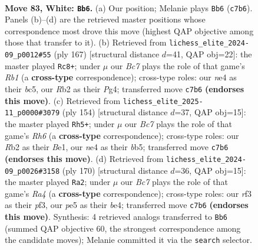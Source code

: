 \documentclass[11pt]{article}
\begin{document}
\clearpage

\begin{figure}[p]\centering
\begin{subfigure}{0.46\textwidth}\centering
\resizebox{\linewidth}{!}{%
\newchessgame
\chessboard[
  setfen={8/2B5/4k2p/3pp1b1/1K2n2p/5r2/1R6/8 w - - 0 83},
  showmover=false,
  pgfstyle=straightmove, color=movearrow, markmove={c7-b6}
]}
\caption{}
\end{subfigure}\hfill
\begin{subfigure}{0.46\textwidth}\centering
\resizebox{\linewidth}{!}{%
\newchessgame
\chessboard[
  setfen={1r6/8/1PKP2k1/2B5/6p1/8/8/5R2 b - - 3 84},
  showmover=false,
  pgfstyle=straightmove, color=movearrow, markmove={b8-c8}
]}
\caption{}
\end{subfigure}
\\[4pt]
\begin{subfigure}{0.46\textwidth}\centering
\resizebox{\linewidth}{!}{%
\newchessgame
\chessboard[
  setfen={8/8/p2n3R/Pbpk4/5K2/8/8/4B3 w - - 33 78},
  showmover=false,
  pgfstyle=straightmove, color=movearrow, markmove={h6-h5}
]}
\caption{}
\end{subfigure}\hfill
\begin{subfigure}{0.46\textwidth}\centering
\resizebox{\linewidth}{!}{%
\newchessgame
\chessboard[
  setfen={8/8/6p1/7p/R3b2P/3nkp2/8/5K2 w - - 4 86},
  showmover=false,
  pgfstyle=straightmove, color=movearrow, markmove={a4-a2}
]}
\caption{}
\end{subfigure}
\caption{\textbf{Move 83, White: \texttt{Bb6}.} (a) Our position; Melanie plays \texttt{Bb6} (\texttt{c7b6}). Panels (b)--(d) are the retrieved master positions whose correspondence most drove this move (highest QAP objective among those that transfer to it). (b) Retrieved from \texttt{lichess\_elite\_2024-09\_p0012\#55} (ply 167) [structural distance $d$=41, QAP obj=22]: the master played \texttt{Rc8+}; under $\mu$ our \emph{Bc7} plays the role of that game's \emph{Rb1} (a \textbf{cross-type} correspondence); cross-type roles: our \emph{n}e4 as their \emph{b}c5, our \emph{R}b2 as their \emph{P}g4; transferred move \texttt{c7b6} \textbf{(endorses this move)}. (c) Retrieved from \texttt{lichess\_elite\_2025-11\_p0000\#3079} (ply 154) [structural distance $d$=37, QAP obj=15]: the master played \texttt{Rh5+}; under $\mu$ our \emph{Bc7} plays the role of that game's \emph{Rh6} (a \textbf{cross-type} correspondence); cross-type roles: our \emph{R}b2 as their \emph{B}e1, our \emph{n}e4 as their \emph{b}b5; transferred move \texttt{c7b6} \textbf{(endorses this move)}. (d) Retrieved from \texttt{lichess\_elite\_2024-09\_p0026\#3158} (ply 170) [structural distance $d$=36, QAP obj=15]: the master played \texttt{Ra2}; under $\mu$ our \emph{Bc7} plays the role of that game's \emph{Ra4} (a \textbf{cross-type} correspondence); cross-type roles: our \emph{r}f3 as their \emph{p}f3, our \emph{p}e5 as their \emph{b}e4; transferred move \texttt{c7b6} \textbf{(endorses this move)}. Synthesis: 4 retrieved analogs transferred to \texttt{Bb6} (summed QAP objective 60, the strongest correspondence among the candidate moves); Melanie committed it via the \texttt{search} selector.}
\label{fig:thought-m164}
\end{figure}
\end{document}
